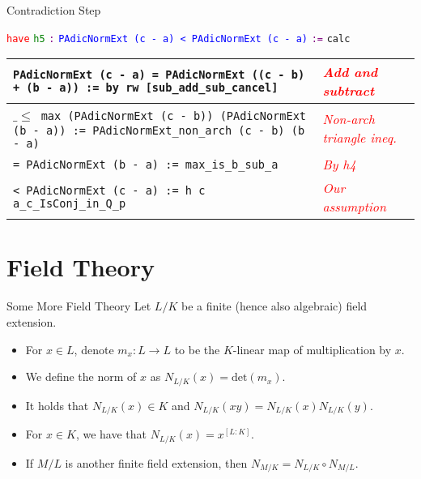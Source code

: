 \documentclass{beamer}
\begin{document}
\begin{frame}{Contradiction Step}

\scriptsize
\textcolor{red}{\texttt{have}} \textcolor{green}{\texttt{h5}} \textcolor{purple}{\texttt{:}} \textcolor{blue}{\texttt{PAdicNormExt (c - a) < PAdicNormExt (c - a)}} \textcolor{purple}{\texttt{:=}} \texttt{calc}

\vspace{1em}

\begin{center}
\begin{tabular}{|m{}|>{\centering\arraybackslash}m{}|}
\hline
\texttt{PAdicNormExt (c - a) = PAdicNormExt ((c - b) + (b - a)) := by rw [sub\_add\_sub\_cancel]} &
\textit{\textcolor{red}{Add and subtract}} \\
\hline
$\_\leq\,$ \texttt{max (PAdicNormExt (c - b)) (PAdicNormExt (b - a)) := PAdicNormExt\_non\_arch (c - b) (b - a)} &
\textit{\textcolor{red}{Non-arch triangle ineq.}} \\
\hline
\texttt{= PAdicNormExt (b - a) := max\_is\_b\_sub\_a} &
\textit{\textcolor{red}{By h4}} \\
\hline
\texttt{< PAdicNormExt (c - a) := h c a\_c\_IsConj\_in\_Q\_p} &
\textit{\textcolor{red}{Our assumption}} \\
\hline
\end{tabular}
\end{center}

\end{frame}


\section{Field Theory}
\begin{frame}{Some More Field Theory}
    Let $L/K$ be a finite (hence also algebraic) field extension. 
    \begin{itemize}
        \item For $x \in L$, denote $m_x \colon L \to L$ to be the $K$-linear map of 
        multiplication by $x$.
        \pause 
        \item We define the norm of $x$ as $N_{L/K}(x) = \mathrm{det}(m_x)$.
        \pause 
        \item It holds that $N_{L/K}(x) \in K$ and $N_{L/K}(xy) = N_{L/K}(x)N_{L/K}(y)$.
        \pause 
        \item For $x \in K$, we have that $N_{L/K}(x) = x^{[L : K]}$.
        \pause 
        \item If $M/L$ is another finite field extension, then $N_{M/K} = N_{L/K} \circ N_{M/L}$.
    \end{itemize}
\end{frame}
\end{document}
